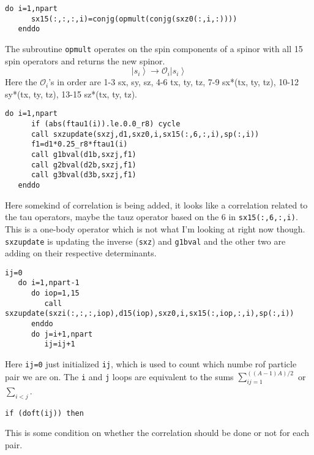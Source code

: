 \documentclass[12pt]{extarticle}
\newcommand{\Oi}{\mathcal{O}_{i}}
\newcommand{\ket}[1]{\left| #1 \right>}
\newcommand{\bverb}{\begin{Verbatim}[frame=single]}
\begin{document}
\bverb
   do i=1,npart
      sx15(:,:,:,i)=conjg(opmult(conjg(sxz0(:,i,:))))
   enddo
\end{Verbatim}
The subroutine \texttt{opmult} operates on the spin components of a spinor with all 15 spin operators and returns the new spinor.
\begin{equation}
  \ket{s_i} \rightarrow \Oi\ket{s_i}
\end{equation}
Here the $\Oi$'s in order are 1-3 sx, sy, sz, 4-6 tx, ty, tz, 7-9 sx*(tx, ty, tz), 10-12 sy*(tx, ty, tz), 13-15 sz*(tx, ty, tz).

\bverb
   do i=1,npart
      if (abs(ftau1(i)).le.0.0_r8) cycle
      call sxzupdate(sxzj,d1,sxz0,i,sx15(:,6,:,i),sp(:,i))
      f1=d1*0.25_r8*ftau1(i)
      call g1bval(d1b,sxzj,f1)
      call g2bval(d2b,sxzj,f1)
      call g3bval(d3b,sxzj,f1)
   enddo
\end{Verbatim}
Here somekind of correlation is being added, it looks like a correlation related to the tau operators, maybe the tauz operator based on the 6 in \texttt{sx15(:,6,:,i)}. This is a one-body operator which is not what I'm looking at right now though. \texttt{sxzupdate} is updating the inverse (\texttt{sxz}) and \texttt{g1bval} and the other two are adding on their respective determinants.

\bverb
   ij=0
   do i=1,npart-1
      do iop=1,15
         call sxzupdate(sxzi(:,:,:,iop),d15(iop),sxz0,i,sx15(:,iop,:,i),sp(:,i))
      enddo
      do j=i+1,npart
         ij=ij+1
\end{Verbatim}
Here \texttt{ij=0} just initialized \texttt{ij}, which is used to count which numbe rof particle pair we are on. The \texttt{i} and \texttt{j} loops are equivalent to the sums $\sum_{ij=1}^{((A-1)A)/2}$ or $\sum_{i<j}$.

\bverb
         if (doft(ij)) then
\end{Verbatim}
This is some condition on whether the correlation should be done or not for each pair.
\end{document}
